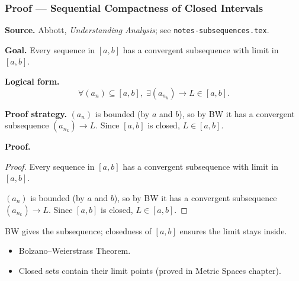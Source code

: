 
\clearpage
{}
\hypertarget{proof-RA-ABB-C-seq-compactness-interval}{}

\subsubsection[Sequential Compactness of Closed Intervals]{Proof --- Sequential Compactness of Closed Intervals}

\bigskip

\noindent
\textbf{Source.}
Abbott, \emph{Understanding Analysis}; see \texttt{notes-subsequences.tex}.

\vspace{0.75em}

\noindent
\textbf{Goal.}
Every sequence in $[a,b]$ has a convergent subsequence with limit in $[a,b]$.

\vspace{0.75em}

\noindent
\textbf{Logical form.}
\[
  \forall (a_n) \subseteq [a,b],\; \exists (a_{n_k}) \to L \in [a,b].
\]

\vspace{0.75em}

\noindent
\textbf{Proof strategy.}
$(a_n)$ is bounded (by $a$ and $b$), so by BW it has a convergent subsequence $(a_{n_k}) \to L$. Since $[a,b]$ is closed, $L \in [a,b]$.

\vspace{0.75em}

\noindent
\textbf{Proof.}
\begin{proof}
\Claim Every sequence in $[a,b]$ has a convergent subsequence with limit in $[a,b]$.

\Given 

\Goal 

\Strategy $(a_n)$ is bounded (by $a$ and $b$), so by BW it has a convergent subsequence $(a_{n_k}) \to L$. Since $[a,b]$ is closed, $L \in [a,b]$.

\medskip


\end{proof}

\begin{remark*}
BW gives the subsequence; closedness of $[a,b]$ ensures the limit stays inside.
\end{remark*}

\begin{remark*}[Dependencies]
\begin{itemize}
  \item Bolzano--Weierstrass Theorem.
  \item Closed sets contain their limit points (proved in Metric Spaces chapter).
\end{itemize}
\end{remark*}
